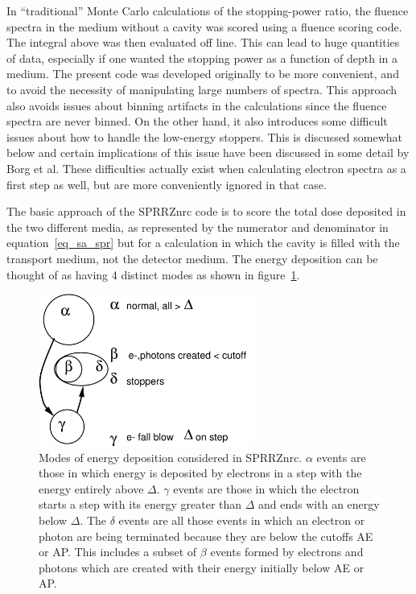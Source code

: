 \documentclass[12pt,twoside]{article}  %
\begin{document}
In ``traditional'' Monte Carlo calculations of the stopping-power ratio,
the fluence spectra in the medium without a cavity was scored using a
fluence scoring code. The integral above was then evaluated off line.
This can lead to huge quantities of data, especially if one wanted the
stopping power as a function of depth in a medium.  The present code was
developed originally to be more convenient, and to avoid the necessity of
manipulating large numbers of spectra. This approach also avoids issues
about binning artifacts in the calculations since the fluence spectra are
never binned.  On the other hand, it also introduces some difficult issues
about how to handle the low-energy stoppers.  This is discussed somewhat
below and certain implications of this issue have been discussed in some
detail by Borg et al\cite{Bo99a}. These difficulties actually exist when
calculating electron spectra as a first step as well, but are more
conveniently ignored in that case.

The basic approach of the SPRRZnrc code is to score the total dose
deposited in the two different media, as represented by the numerator and
denominator in equation~\ref{eq_sa_spr} but for a calculation in which the
cavity is filled with the transport medium, not the detector medium. The
energy deposition can be thought of as having 4 distinct modes as shown
in figure~\ref{fig_spr_logic}.
\begin{figure}[hbt]
\begin{center}
\includegraphics[height=5cm]{figures/sprrz_logic}
\end{center}
\caption[Energy deposition classes in SPRRZnrc]{Modes of energy deposition considered in SPRRZnrc. $\alpha$ events
are those in which energy is deposited by electrons in a step with the
energy entirely above $\Delta$. $\gamma$ events are those in which the
electron starts a step with its energy greater than $\Delta$ and ends with
an energy below $\Delta$. The $\delta$ events are all those events in which
an electron or photon are being terminated because they are below the
cutoffs AE or AP.  This includes a subset of $\beta$ events formed by
electrons and photons which are created with their energy initially below
AE or AP.}
\label{fig_spr_logic}
\end{figure}
\end{document}

